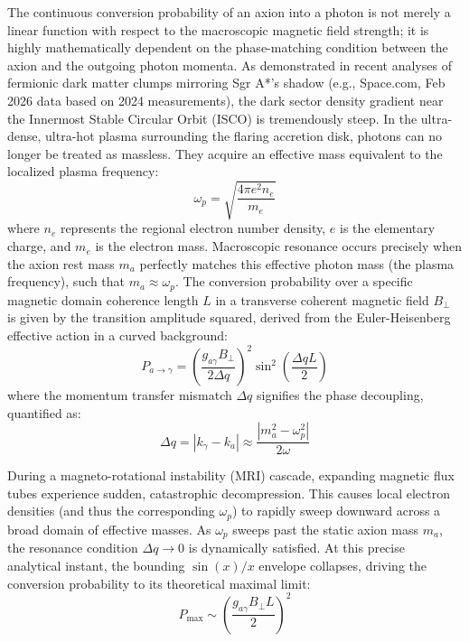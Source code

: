 \documentclass[12pt,a4paper]{article}
\begin{document}
The continuous conversion probability of an axion into a photon is not merely a linear function with respect to the macroscopic magnetic field strength; it is highly mathematically dependent on the phase-matching condition between the axion and the outgoing photon momenta. As demonstrated in recent analyses of fermionic dark matter clumps mirroring Sgr A*'s shadow (e.g., Space.com, Feb 2026 data based on 2024 measurements), the dark sector density gradient near the Innermost Stable Circular Orbit (ISCO) is tremendously steep. In the ultra-dense, ultra-hot plasma surrounding the flaring accretion disk, photons can no longer be treated as massless. They acquire an effective mass equivalent to the localized plasma frequency:
\begin{equation}
    \omega_p = \sqrt{\frac{4\pi e^2 n_e}{m_e}}
\end{equation}
where $n_e$ represents the regional electron number density, $e$ is the elementary charge, and $m_e$ is the electron mass. Macroscopic resonance occurs precisely when the axion rest mass $m_a$ perfectly matches this effective photon mass (the plasma frequency), such that $m_a \approx \omega_p$. The conversion probability over a specific magnetic domain coherence length $L$ in a transverse coherent magnetic field $B_\perp$ is given by the transition amplitude squared, derived from the Euler-Heisenberg effective action in a curved background:
\begin{equation}
    P_{a\to\gamma} = \left( \frac{g_{a\gamma} B_\perp}{2 \Delta q} \right)^2 \sin^2 \left( \frac{\Delta q L}{2} \right)
\end{equation}
where the momentum transfer mismatch $\Delta q$ signifies the phase decoupling, quantified as:
\begin{equation}
    \Delta q = |k_\gamma - k_a| \approx \frac{|m_a^2 - \omega_p^2|}{2\omega}
\end{equation}

During a magneto-rotational instability (MRI) cascade, expanding magnetic flux tubes experience sudden, catastrophic decompression. This causes local electron densities (and thus the corresponding $\omega_p$) to rapidly sweep downward across a broad domain of effective masses. As $\omega_p$ sweeps past the static axion mass $m_a$, the resonance condition $\Delta q \to 0$ is dynamically satisfied. At this precise analytical instant, the bounding $\sin(x)/x$ envelope collapses, driving the conversion probability to its theoretical maximal limit:
\begin{equation}
    P_{\text{max}} \sim \left( \frac{g_{a\gamma} B_\perp L}{2} \right)^2
\end{equation}
\end{document}
